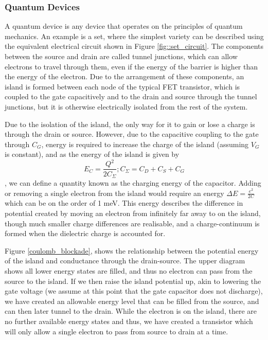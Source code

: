 \subsubsection{Quantum Devices}
\label{sec::set}
A quantum device is any device that operates on the principles of quantum mechanics. An example is a \gls{set}, where the simplest variety can be described using the equivalent electrical circuit \cite{devoret2000amplifying} shown in Figure \ref{fig::set_circuit}. The components between the source and drain are called tunnel junctions, which can allow electrons to travel through them, even if the energy of the barrier is higher than the energy of the electron. Due to the arrangement of these components, an island is formed between each node of the typical FET transistor, which is coupled to the gate capacitively and to the drain and source through the tunnel junctions, but it is otherwise electrically isolated from the rest of the system.

Due to the isolation of the island, the only way for it to gain or lose a charge is through the drain or source. However, due to the capacitive coupling to the gate through $C_G$, energy is required to increase the charge of the island (assuming $V_G$ is constant), and as the energy of the island is given by $$E_C = \frac{Q^2}{2 C_\Sigma} ; C_\Sigma = C_D + C_S + C_G$$, we can define a quantity known as the charging energy of the capacitor. Adding or removing a single electron from the island would require an energy $\Delta E = \frac{e^2}{2 C}$ which can be on the order of 1 meV. This energy describes the difference in potential created by moving an electron from infinitely far away to on the island, though much smaller charge differences are realisable, and a charge-continuum is formed when the dielectric charge is accounted for.

Figure \ref{coulomb_blockade}, shows the relationship between the potential energy of the island and conductance through the drain-source. The upper diagram shows all lower energy states are filled, and thus no electron can pass from the source to the island. If we then raise the island potential up, akin to lowering the gate voltage (we assume at this point that the gate capacitor does not discharge), we have created an allowable energy level that can be filled from the source, and can then later tunnel to the drain. While the electron is on the island, there are no further available energy states and thus, we have created a transistor which will only allow a single electron to pass from source to drain at a time.

